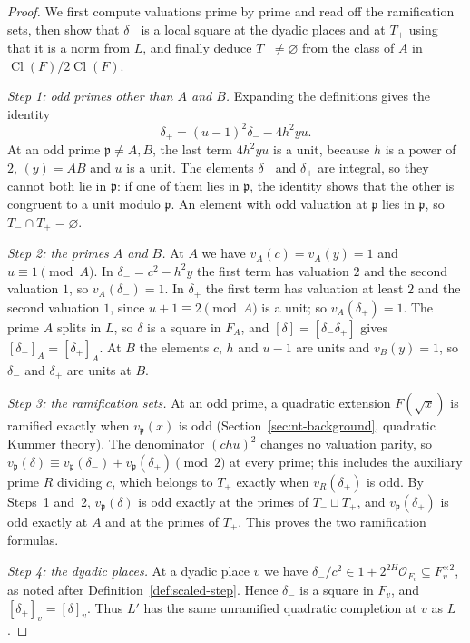 \documentclass[11pt]{article}
\theoremstyle{plain}
\theoremstyle{definition}
\theoremstyle{remark}
\DeclareMathOperator{\Cl}{Cl}
\newcommand{\OO}{\mathcal O}
\begin{document}
\begin{proof}
We first compute valuations prime by prime and read off the ramification
sets, then show that $\delta_-$ is a local square at the dyadic places and
at $T_+$ using that it is a norm from $L$, and finally deduce
$T_-\ne\varnothing$ from the class of $A$ in $\Cl(F)/2\Cl(F)$.

\emph{Step 1: odd primes other than $A$ and $B$.}  Expanding the
definitions gives the identity
\begin{equation}\label{eq:comparison-difference}
 \delta_+=(u-1)^2\delta_--4h^2yu.
\end{equation}
At an odd prime $\mathfrak p\ne A,B$, the last term $4h^2yu$ is a unit,
because $h$ is a power of $2$, $(y)=AB$ and $u$ is a unit.  The elements
$\delta_-$ and $\delta_+$ are integral, so they cannot both lie in
$\mathfrak p$: if one of them lies in $\mathfrak p$, the identity shows
that the other is congruent to a unit modulo $\mathfrak p$.  An element
with odd valuation at $\mathfrak p$ lies in $\mathfrak p$, so $T_-\cap T_+=\varnothing$.

\emph{Step 2: the primes $A$ and $B$.}  At $A$ we have
$v_A(c)=v_A(y)=1$ and $u\equiv1\pmod A$.  In $\delta_-=c^2-h^2y$ the first
term has valuation $2$ and the second valuation $1$, so $v_A(\delta_-)=1$.
In $\delta_+$ the first term has valuation at least $2$ and the second
valuation $1$, since $u+1\equiv2\pmod A$ is a unit; so $v_A(\delta_+)=1$.
The prime $A$ splits in $L$, so $\delta$ is a square in $F_A$, and
$[\delta]=[\delta_-\delta_+]$ gives $[\delta_-]_A=[\delta_+]_A$.  At $B$ the
elements $c$, $h$ and $u-1$ are units and $v_B(y)=1$, so $\delta_-$ and
$\delta_+$ are units at $B$.

\emph{Step 3: the ramification sets.}  At an odd prime, a quadratic
extension $F(\sqrt x)$ is ramified exactly when $v_{\mathfrak p}(x)$ is odd
(Section~\ref{sec:nt-background}, quadratic Kummer theory).  The
denominator $(chu)^2$ changes no valuation parity, so
$v_{\mathfrak p}(\delta)\equiv v_{\mathfrak p}(\delta_-)+v_{\mathfrak
p}(\delta_+)\pmod 2$ at every prime; this includes the auxiliary prime
$R$ dividing $c$, which belongs to $T_+$ exactly when $v_R(\delta_+)$ is
odd.  By Steps~1 and~2, $v_{\mathfrak p}(\delta)$ is odd exactly at the
primes of $T_-\sqcup T_+$, and $v_{\mathfrak p}(\delta_+)$ is odd exactly
at $A$ and at the primes of $T_+$.  This proves the two ramification
formulas.

\emph{Step 4: the dyadic places.}  At a dyadic place $v$ we have
$\delta_-/c^2\in1+2^{2H}\OO_{F_v}\subseteq F_v^{\times2}$, as noted after
Definition~\ref{def:scaled-step}.  Hence $\delta_-$ is a square in $F_v$,
and $[\delta_+]_v=[\delta]_v$.  Thus $L'$ has the same unramified quadratic
completion at $v$ as $L$.


\end{proof}
\end{document}
